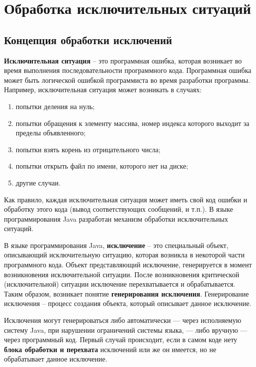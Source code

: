 \newpage
\chapter{Обработка исключительных ситуаций}

\section{Концепция обработки исключений}

\textbf{Исключительная ситуация} – это программная ошибка, которая возникает во время выполнения последовательности программного кода. Программная ошибка может быть логической ошибкой программиста во время разработки программы. Например, исключительная ситуация может возникать в случаях:

\begin{enumerate}
    \item попытки деления на нуль;
    \item попытки обращения к элементу массива, номер индекса которого выходит за пределы объявленного;
    \item попытки взять корень из отрицательного числа;
    \item попытки открыть файл по имени, которого нет на диске;
    \item другие случаи.
\end{enumerate}

Как правило, каждая исключительная ситуация может иметь свой код ошибки и обработку этого кода (вывод соответствующих сообщений, и т.п.). В языке программирования Java разработан механизм обработки исключительных ситуаций.

В языке программирования Java, \textbf{исключение} – это специальный объект, описывающий исключительную ситуацию, которая возникла в некоторой части программного кода. Объект представляющий исключение, генерируется в момент возникновения исключительной ситуации. После возникновения критической (исключительной) ситуации исключение перехватывается и обрабатывается. Таким образом, возникает понятие \textbf{ генерирования исключения}. Генерирование исключения – процесс создания объекта, который описывает данное исключение.

Исключения могут генерироваться либо автоматически — через исполняемую систему Java, при нарушении ограничений системы языка, — либо вручную — через программный код. Первый случай происходит, если в самом коде нету \textbf{блока обработки и перехвата} исключений или же он имеется, но не обрабатывает данное исключение.

